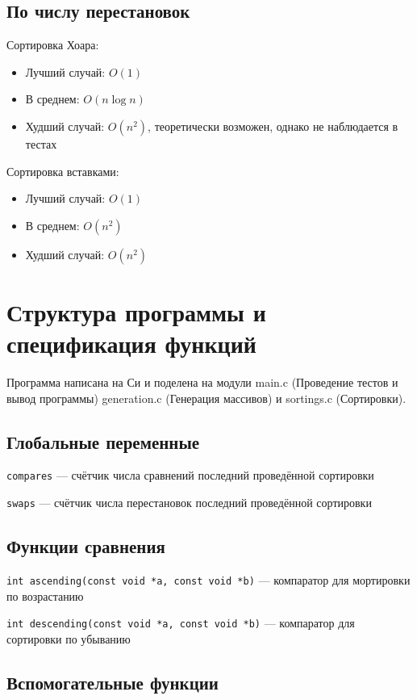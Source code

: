 \documentclass[a4paper,12pt,titlepage,finall]{article}
\begin{document}
\subsection*{По числу перестановок}
Сортировка Хоара:
\begin{itemize}
	\item Лучший случай: $O(1)$
	\item В среднем: $O(n \log n)$
	\item Худший случай: $O(n^2)$, теоретически возможен, однако не наблюдается в тестах
\end{itemize}
Сортировка вставками:
\begin{itemize}
	\item Лучший случай: $O(1)$
	\item В среднем: $O(n^2)$
	\item Худший случай: $O(n^2)$
\end{itemize}

\newpage

\section{Структура программы и спецификация функций}

Программа написана на Си и поделена на модули main.c (Проведение тестов и вывод программы) generation.c (Генерация массивов) и sortings.c (Сортировки).

\subsection{Глобальные переменные}

\texttt{compares} — счётчик числа сравнений последний проведённой сортировки

\texttt{swaps} — счётчик числа перестановок последний проведённой сортировки

\subsection{Функции сравнения}

\texttt{int ascending(const void *a, const void *b)} — компаратор для мортировки по возрастанию

\texttt{int descending(const void *a, const void *b)} — компаратор для сортировки по убыванию

\subsection{Вспомогательные функции}
\end{document}
